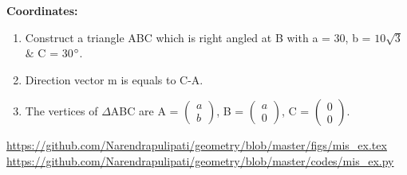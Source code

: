 \begin{frame}{}
\begin{figure}[!ht]
	\begin{center}
		\resizebox{0.8\columnwidth}{!}{}
	\end{center}
	\caption{}
	\label{}	
\end{figure}
\end{frame}
\begin{frame}
\textbf{Coordinates:}
\begin{enumerate}
\item Construct a triangle ABC which is right angled at B with a = 30, b = $10\sqrt{3}$ $\&$ C = 30$\degree$.
\item Direction vector m is equals to C-A.
\item The vertices of $\Delta$ABC are A = $\begin{pmatrix} a\\b \end{pmatrix}$, B = $\begin{pmatrix} a\\0 \end{pmatrix}$, C = $\begin{pmatrix} 0\\0 \end{pmatrix}.$ 
\end{enumerate}
\url{https://github.com/Narendrapulipati/geometry/blob/master/figs/mis_ex.tex}\\
\url{https://github.com/Narendrapulipati/geometry/blob/master/codes/mis_ex.py}
\end{frame}